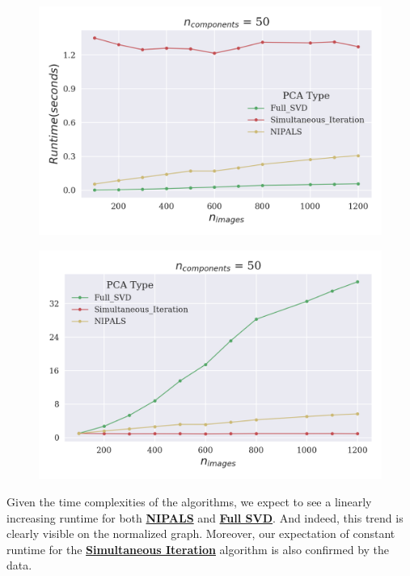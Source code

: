 \documentclass[12pt]{article}
\begin{document}
\begin{figure}[H]
\centering
\begin{minipage}{.45\textwidth}
  \centering
  \includegraphics[width=\linewidth]{UImages.png}
  \label{UImages}
\end{minipage}%
\quad
\begin{minipage}{.45\textwidth}
  \centering
  \includegraphics[width=\linewidth]{NImages.png}
  \label{NImages}
\end{minipage}
\end{figure}

Given the time complexities of the algorithms, we expect to see a linearly increasing runtime for both \textbf{\hyperref[3.1]{NIPALS}} and \textbf{\hyperref[3.2]{Full SVD}}. And indeed, this trend is clearly visible on the normalized graph. Moreover, our expectation of constant runtime for the \textbf{\hyperref[3.3]{Simultaneous Iteration}} algorithm is also confirmed by the data. 
\end{document}
